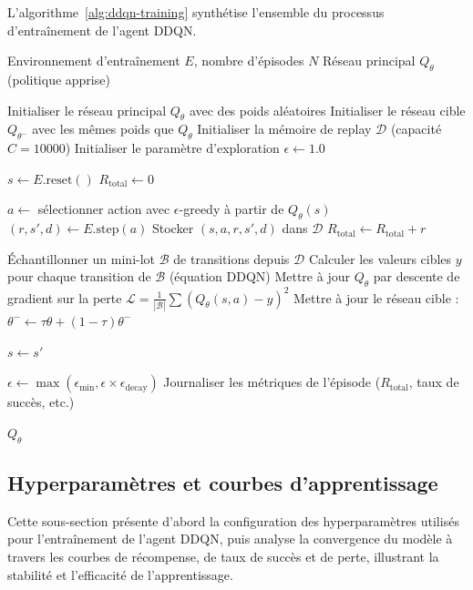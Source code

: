 L'algorithme~\ref{alg:ddqn-training} synthétise l'ensemble du processus d'entraînement de l'agent DDQN.

\begin{algorithm}[H]
	\caption{Entraînement de l'agent DDQN pour l'optimisation LR-FHSS}
	\label{alg:ddqn-training}
	\begin{algorithmic}[1]
		\Require Environnement d'entraînement $E$, nombre d'épisodes $N$
		\Ensure Réseau principal $Q_\theta$ (politique apprise)
		
		\State Initialiser le réseau principal $Q_\theta$ avec des poids aléatoires
		\State Initialiser le réseau cible $Q_{\theta^-}$ avec les mêmes poids que $Q_\theta$
		\State Initialiser la mémoire de replay $\mathcal{D}$ (capacité $C = 10 000$)
		\State Initialiser le paramètre d'exploration $\epsilon \leftarrow 1.0$
		
		\State $s \gets E.\text{reset}()$ 
		\State $R_{\text{total}} \gets 0$
		
		\State $a \gets$ sélectionner action avec $\epsilon$-greedy à partir de $Q_\theta(s)$
		\State $(r, s', d) \gets E.\text{step}(a)$ 
		\State Stocker $(s, a, r, s', d)$ dans $\mathcal{D}$
		\State $R_{\text{total}} \gets R_{\text{total}} + r$
		
		\State Échantillonner un mini-lot $\mathcal{B}$ de transitions depuis $\mathcal{D}$
		\State Calculer les valeurs cibles $y$ pour chaque transition de $\mathcal{B}$ (équation DDQN)
		\State Mettre à jour $Q_\theta$ par descente de gradient sur la perte $\mathcal{L} = \frac{1}{|\mathcal{B}|}\sum (Q_\theta(s,a) - y)^2$
		\State Mettre à jour le réseau cible : $\theta^- \leftarrow \tau \theta + (1 - \tau) \theta^-$
		\EndIf
		
		\State $s \gets s'$
		\EndWhile
		
		\State $\epsilon \gets \max(\epsilon_{\text{min}}, \epsilon \times \epsilon_{\text{decay}})$
		\State Journaliser les métriques de l'épisode ($R_{\text{total}}$, taux de succès, etc.)
		\EndFor
		
		\State \Return $Q_\theta$
	\end{algorithmic}
\end{algorithm}

\subsection{Hyperparamètres et courbes d'apprentissage}
Cette sous-section présente d’abord la configuration des hyperparamètres utilisés pour l’entraînement de l’agent DDQN, puis analyse la convergence du modèle à travers les courbes de récompense, de taux de succès et de perte, illustrant la stabilité et l’efficacité de l’apprentissage.
